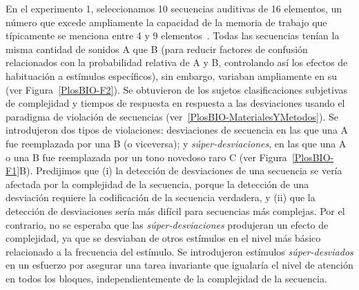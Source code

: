 
En el experimento 1, seleccionamos 10 secuencias auditivas de 16 elementos, un número que excede ampliamente la capacidad de la memoria de trabajo que típicamente se menciona entre 4 y 9 elementos~\cite{f25,f29,f86}. Todas las secuencias tenían la misma cantidad de sonidos A que B (para reducir factores de confusión relacionados con la probabilidad relativa de A y B, controlando así los efectos de habituación a estímulos específicos), sin embargo, variaban ampliamente en su \mdlbin (ver Figura~\ref{PlosBIO-F2}). Se obtuvieron de los sujetos clasificaciones subjetivas de complejidad y tiempos de respuesta en respuesta a las desviaciones usando el paradigma de violación de secuencias (ver~\ref{PlosBIO-MaterialesYMetodos}). Se introdujeron dos tipos de violaciones: desviaciones de secuencia en las que una A fue reemplazada por una B (o viceversa); y \textit{súper-desviaciones}, en las que una A o una B fue reemplazada por un tono novedoso raro C (ver Figura~\ref{PlosBIO-F1}B). Predijimos que (i) la detección de desviaciones de una secuencia se vería afectada por la complejidad de la secuencia, porque la detección de una desviación requiere la codificación de la secuencia verdadera, y (ii) que la detección de desviaciones sería más difícil para secuencias más complejas. Por el contrario, no se esperaba que las \textit{súper-desviaciones} produjeran un efecto de complejidad, ya que se desviaban de otros estímulos en el nivel más básico relacionado a la frecuencia del estímulo. Se introdujeron estímulos \textit{súper-desviados} en un esfuerzo por asegurar una tarea invariante que igualaría el nivel de atención en todos los bloques, independientemente de la complejidad de la secuencia. 

